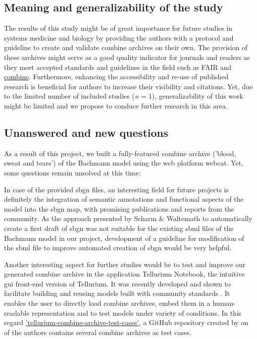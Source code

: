 \subsection*{Meaning and generalizability of the study}
The results of this study might be of great importance for future studies in systems medicine and biology by providing the authors with a protocol and guideline to create and validate \ac{combine} archives on their own. The provision of these archives might serve as a good quality indicator for journals and readers as they meet accepted standards and guidelines in the field such as FAIR \cite{wilkinson2016fair} and \hyperlink{http://co.mbine.org/}{\ac{combine}}. Furthermore, enhancing the accessibility and re-use of published research is beneficial for authors to increase their visibility and citations. Yet, due to the limited number of included studies (\textit{n} = 1), generalizability of this work might be limited and we propose to conduce further research in this area.

\subsection*{Unanswered and new questions}
As a result of this project, we built a fully-featured \ac{combine} archive ('blood, sweat and tears') of the Bachmann model \cite{bachmannmodel} using the web platform \ac{webcat}. Yet, some questions remain unsolved at this time:

In case of the provided \ac{sbgn} files, an interesting field for future projects is definitely the integration of semantic annotations and functional aspects of the model into the \ac{sbgn} map, with promising publications and reports from the community. As the approach presented by Scharm \& Waltemath \cite{combine} to automatically create a first draft of \ac{sbgn} was not suitable for the existing \ac{sbml} files of the Bachmann model in our project, development of a guideline for modification of the \ac{sbml} file to improve automated creation of \ac{sbgn} would be very helpful.

Another interesting aspect for further studies would be to test and improve our generated \ac{combine} archive in the application Tellurium Notebook, the intuitive \ac{gui} front-end version of Tellurium. It was recently developed and shown to facilitate building and reusing models built with community standards \cite{choi2018tellurium}. It enables the user to directly load \ac{combine} archives, embed them in a human-readable representation and to test models under variety of conditions. In this regard \hyperlink{https://github.com/0u812/tellurium-combine-archive-test-cases}{'tellurium-combine-archive-test-cases'}, a GitHub repository created by on of the authors contains several \ac{combine} archives as test cases.

